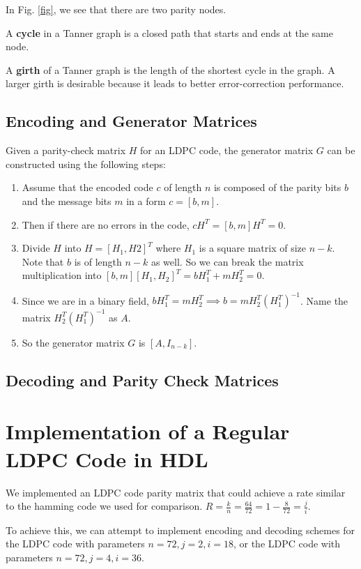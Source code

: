 \documentclass[conference]{IEEEtran}
\begin{document}
In Fig. \ref{fig}, we see that there are two parity nodes.

A \textbf{cycle} in a Tanner graph is a closed path that starts and ends at the same node.

A \textbf{girth} of a Tanner graph is the length of the shortest cycle in the graph. A larger girth is desirable because it leads to better error-correction performance.

\subsection{Encoding and Generator Matrices}
Given a parity-check matrix $H$ for an LDPC code, the generator matrix $G$ can be constructed using the following steps:

\begin{enumerate}
    \item Assume that the encoded code $c$ of length $n$ is composed of the parity bits $b$ and the message bits $m$ in a form $c = [b, m]$.
    \item Then if there are no errors in the code, $cH^T = [b, m]H^T = 0$.
    \item Divide $H$ into $H = [H_1, H2]^T$ where $H_1$ is a square matrix of size $n-k$. Note that $b$ is of length $n-k$ as well. So we can break the matrix multiplication into $[b, m][H_1, H_2]^T = bH_1^T + mH_2^T = 0$.
    \item Since we are in a binary field, $bH_1^T = mH_2^T \implies b = mH_2^T(H_1^T)^{-1}$. Name the matrix $H_2^T(H_1^T)^{-1}$ as $A$.
    \item So the generator matrix $G$ is $[A, I_{n-k}]$.
\end{enumerate}

\subsection{Decoding and Parity Check Matrices}

\section{Implementation of a Regular LDPC Code in HDL}
We implemented an LDPC code parity matrix that could achieve a rate similar to the hamming code we used for comparison.
$R=\frac{k}{n}=\frac{64}{72}=1-\frac{8}{72} = \frac{j}{i}$.

To achieve this, we can attempt to implement encoding and decoding schemes for the LDPC code with parameters $n=72, j=2, i=18$, or the LDPC code with parameters $n=72, j=4, i=36$.
\end{document}
